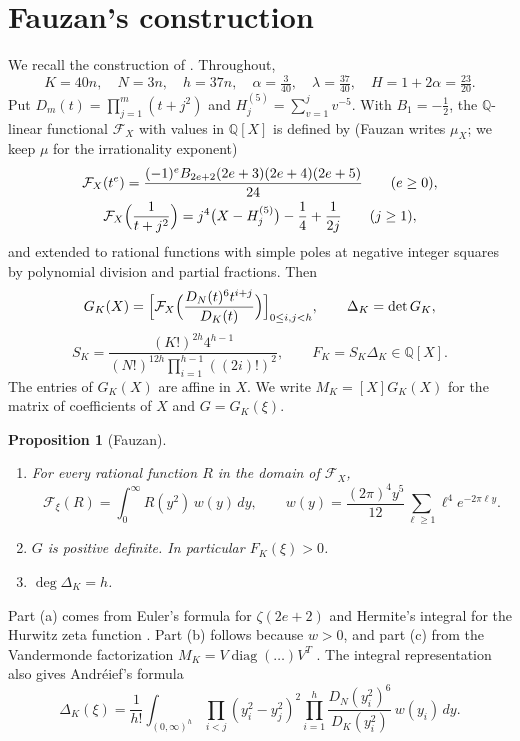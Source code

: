 \documentclass[11pt]{amsart}
\newtheorem{proposition}[theorem]{Proposition}
\theoremstyle{definition}
\theoremstyle{remark}
\numberwithin{equation}{section}
\newcommand{\Q}{\mathbb Q}
\begin{document}
\section{Fauzan's construction}\label{sec:construction}

We recall the construction of \cite[\S2]{Fauzan2026}. Throughout,
\begin{equation}\label{eq:params}
 K=40n,\quad N=3n,\quad h=37n,\quad \alpha=\tfrac3{40},\quad\lambda=\tfrac{37}{40},\quad H=1+2\alpha=\tfrac{23}{20}.
\end{equation}
Put $D_m(t)=\prod_{j=1}^m(t+j^2)$ and $H^{(5)}_j=\sum_{v=1}^jv^{-5}$. With $B_1=-\frac12$, the $\Q$-linear functional
$\mathcal F_X$ with values in $\Q[X]$ is defined by (Fauzan writes $\mu_X$; we keep $\mu$ for the irrationality
exponent)
\begin{gather}
 \mathcal F_X(t^e)=\frac{(-1)^eB_{2e+2}(2e+3)(2e+4)(2e+5)}{24}\qquad(e\ge0),\label{eq:functional}\\
 \mathcal F_X\Bigl(\frac1{t+j^2}\Bigr)=j^4\bigl(X-H^{(5)}_j\bigr)-\frac14+\frac1{2j}\qquad(j\ge1),\notag
\end{gather}
and extended to rational functions with simple poles at negative integer squares by polynomial division and partial
fractions. Then
\begin{equation}\label{eq:matrix}
 G_K(X)=\Bigl[\mathcal F_X\Bigl(\frac{D_N(t)^6t^{i+j}}{D_K(t)}\Bigr)\Bigr]_{0\le i,j<h},\qquad \Delta_K=\det G_K,
\end{equation}
\[
 S_K=\frac{(K!)^{2h}4^{h-1}}{(N!)^{12h}\prod_{i=1}^{h-1}((2i)!)^2},\qquad F_K=S_K\Delta_K\in\Q[X].
\]
The entries of $G_K(X)$ are affine in $X$. We write $M_K=[X]G_K(X)$ for the matrix of coefficients of $X$ and
$G=G_K(\xi)$.

\begin{proposition}[Fauzan]\label{prop:basic}
\begin{enumerate}[label=(\alph*)]
\item For every rational function $R$ in the domain of $\mathcal F_X$,
\[
 \mathcal F_\xi(R)=\int_0^\infty R(y^2)\,w(y)\,dy,\qquad w(y)=\frac{(2\pi)^4y^5}{12}\sum_{\ell\ge1}\ell^4e^{-2\pi\ell y}.
\]
\item $G$ is positive definite. In particular $F_K(\xi)>0$.
\item $\deg\Delta_K=h$.
\end{enumerate}
\end{proposition}

Part (a) comes from Euler's formula for $\zeta(2e+2)$ and Hermite's integral for the Hurwitz zeta function
\cite[(2.10)]{Fauzan2026}. Part (b) follows because $w>0$, and part (c) from the Vandermonde factorization
$M_K=V\operatorname{diag}(\dots)V^T$ \cite[(2.9)]{Fauzan2026}. The integral representation also gives Andr\'eief's
formula
\begin{equation}\label{eq:andreief}
 \Delta_K(\xi)=\frac1{h!}\int_{(0,\infty)^h}\prod_{i<j}(y_i^2-y_j^2)^2\prod_{i=1}^h\frac{D_N(y_i^2)^6}{D_K(y_i^2)}\,w(y_i)\,dy .
\end{equation}
\end{document}

